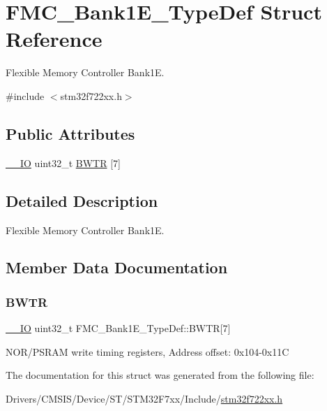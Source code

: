\hypertarget{struct_f_m_c___bank1_e___type_def}{}\section{F\+M\+C\+\_\+\+Bank1\+E\+\_\+\+Type\+Def Struct Reference}
\label{struct_f_m_c___bank1_e___type_def}


Flexible Memory Controller Bank1E.  




{\ttfamily \#include $<$stm32f722xx.\+h$>$}

\subsection*{Public Attributes}
\begin{DoxyCompactItemize}
\item 
\mbox{\hyperlink{core__sc300_8h_aec43007d9998a0a0e01faede4133d6be}{\+\_\+\+\_\+\+IO}} uint32\+\_\+t \mbox{\hyperlink{struct_f_m_c___bank1_e___type_def_abd27ba74f0c9b180f713e7fad065a8d9}{B\+W\+TR}} \mbox{[}7\mbox{]}
\end{DoxyCompactItemize}


\subsection{Detailed Description}
Flexible Memory Controller Bank1E. 

\subsection{Member Data Documentation}
\mbox{\label{struct_f_m_c___bank1_e___type_def_abd27ba74f0c9b180f713e7fad065a8d9}} 
\subsubsection{\texorpdfstring{BWTR}{BWTR}}
{\footnotesize\ttfamily \mbox{\hyperlink{core__sc300_8h_aec43007d9998a0a0e01faede4133d6be}{\+\_\+\+\_\+\+IO}} uint32\+\_\+t F\+M\+C\+\_\+\+Bank1\+E\+\_\+\+Type\+Def\+::\+B\+W\+TR\mbox{[}7\mbox{]}}

N\+O\+R/\+P\+S\+R\+AM write timing registers, Address offset\+: 0x104-\/0x11C 

The documentation for this struct was generated from the following file\+:\begin{DoxyCompactItemize}
\item 
Drivers/\+C\+M\+S\+I\+S/\+Device/\+S\+T/\+S\+T\+M32\+F7xx/\+Include/\mbox{\hyperlink{stm32f722xx_8h}{stm32f722xx.\+h}}\end{DoxyCompactItemize}
